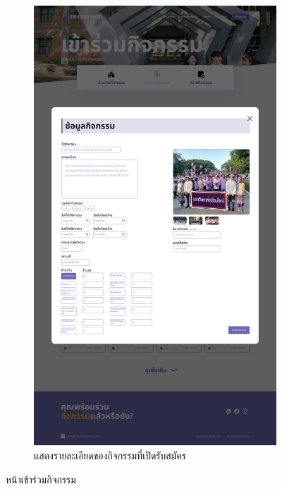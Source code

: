 \begin{figure}[h]
\begin{subfigure}[b]{0.3\linewidth}
    \includegraphics[width=\linewidth]{image/Figma-design/Event-join-1.png}
    \caption{แสดงรายละเอียดของกิจกรรมที่เปิดรับสมัคร}
  \end{subfigure}
  \caption{หน้าเข้าร่วมกิจกรรม}
  \label{fig:event-join}
\end{figure}

